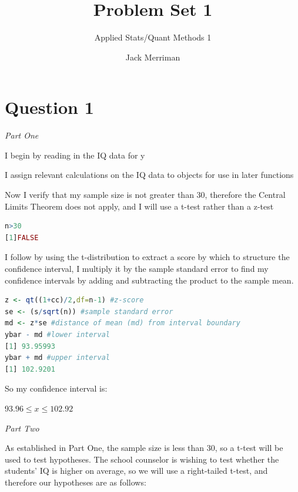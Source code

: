 \documentclass[12pt,letterpaper]{article}
\title{Problem Set 1}
\date{Jack Merriman}
\author{Applied Stats/Quant Methods 1}
\begin{document}
	\maketitle
	
\section*{Question 1 }

\textit{Part One}\\ 

\vspace{.25cm}

\noindent I begin by reading in the IQ data for y

 

\noindent I assign relevant calculations on the IQ data to objects for use in later functions

 

\noindent Now I verify that my sample size is not greater than 30, therefore the Central Limits Theorem does not apply, and I will use a t-test rather than a z-test

\begin{lstlisting}[language=R]
n>30
[1]FALSE
\end{lstlisting}

\noindent I follow by using the t-distribution to extract a score by which to structure the confidence interval, I multiply it by the sample standard error to find my confidence intervals by adding and subtracting the product to the sample mean. 

\begin{lstlisting}[language=R]
z <- qt((1+cc)/2,df=n-1) #z-score
se <- (s/sqrt(n)) #sample standard error
md <- z*se #distance of mean (md) from interval boundary
ybar - md #lower interval
[1] 93.95993
ybar + md #upper interval
[1] 102.9201
\end{lstlisting}

\noindent So my confidence interval is: 

$93.96 \leq x \leq 102.92$

\vspace{1.5cm}

\noindent \textit{Part Two}\\ 

\vspace{.25cm}

\noindent As established in Part One, the sample size is less than 30, so a t-test will be used to test hypotheses. The school counselor is wishing to test whether the students' IQ is higher on average, so we will use a right-tailed t-test, and therefore our hypotheses are as follows:
\end{document}
